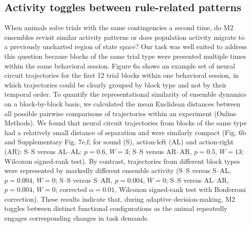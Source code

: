 \subsection{Activity toggles between rule-related patterns}
When animals solve trials with the same contingencies a second time, do M2 ensembles revisit similar activity patterns or does population activity migrate to a previously uncharted region of state space? Our task was well suited to address this question because blocks of the same trial type were presented multiple times within the same behavioral session. Figure 6a shows an example set of neural circuit trajectories for the first 12 trial blocks within one behavioral session, in which trajectories could be clearly grouped by block type and not by their temporal order. To quantify the representational similarity of ensemble dynamics on a block-by-block basis, we calculated the mean Euclidean distances between all possible pairwise comparisons of trajectories within an experiment (Online Methods). We found that neural circuit trajectories from blocks of the same type had a relatively small distance of separation and were similarly compact (Fig. 6b and Supplementary Fig. 7e,f; for sound (S), action-left (AL) and action-right (AR): S–S versus AL–AL: $p = 0.6$, $W = 3$; S–S versus AR–AR, $p = 0.5$, $W = 13$; Wilcoxon signed-rank test). By contrast, trajectories from different block types were represented by markedly different ensemble activity (S–S versus S–AL, $p = 0.004$, $W = 0$; S–S versus S–AR, $p = 0.004$, $W = 0$; S–S versus AL–AR, $p = 0.004$, $W = 0$; corrected $\alpha = 0.01$, Wilcoxon signed-rank test with Bonferroni correction). These results indicate that, during adaptive decision-making, M2 toggles between distinct functional configurations as the animal repeatedly engages corresponding changes in task demands.

